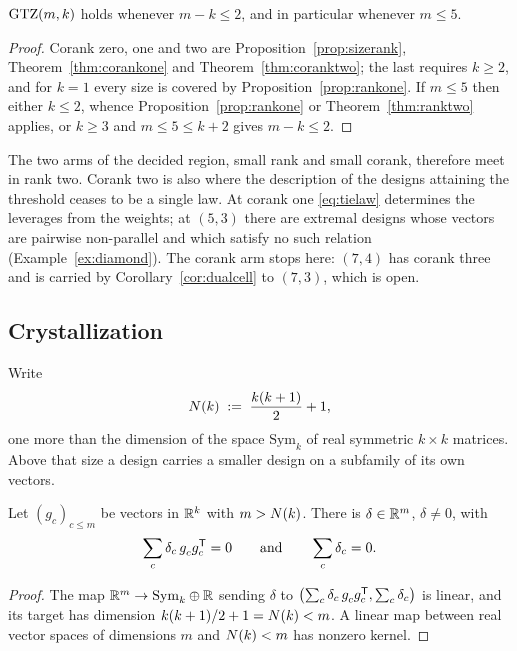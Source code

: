 \begin{corollary}[Lean]\label{cor:corank}
$\mathrm{GTZ}(m,k)$ holds whenever $m-k\le2$, and in particular whenever $m\le5$.
\end{corollary}

\begin{proof}
Corank zero, one and two are Proposition~\ref{prop:sizerank},
Theorem~\ref{thm:corankone} and Theorem~\ref{thm:coranktwo}; the last
requires $k\ge2$, and for $k=1$ every size is covered by
Proposition~\ref{prop:rankone}.  If $m\le5$ then either $k\le2$, whence
Proposition~\ref{prop:rankone} or Theorem~\ref{thm:ranktwo} applies, or
$k\ge3$ and $m\le5\le k+2$ gives $m-k\le2$.
\end{proof}

The two arms of the decided region, small rank and small corank,
therefore meet in rank two.  Corank two is also where the description of
the designs attaining the threshold ceases to be a single law.  At corank
one \eqref{eq:tielaw} determines the leverages from the weights; at
$(5,3)$ there are extremal designs whose vectors are pairwise
non-parallel and which satisfy no such relation
(Example~\ref{ex:diamond}).  The corank arm stops here: $(7,4)$ has corank
three and is carried by Corollary~\ref{cor:dualcell} to $(7,3)$, which is
open.

\subsection{Crystallization}\label{sec:crystal}

Write
\[
  N(k)\;:=\;\frac{k(k+1)}{2}+1 ,
\]
one more than the dimension of the space $\mathrm{Sym}_k$ of real
symmetric $k\times k$ matrices.  Above that size a design carries a
smaller design on a subfamily of its own vectors.

\begin{lemma}[Lean]\label{lem:null}
Let $(g_c)_{c\le m}$ be vectors in $\mathbb{R}^k$ with $m>N(k)$.  There is
$\delta\in\mathbb{R}^m$, $\delta\ne0$, with
\begin{equation}\label{eq:moment}
  \sum_c \delta_c\,g_c^{\vphantom{\mathsf{T}}}g_c\tp=0
  \qquad\text{and}\qquad
  \sum_c \delta_c=0 .
\end{equation}
\end{lemma}

\begin{proof}
The map $\mathbb{R}^m\to\mathrm{Sym}_k\oplus\mathbb{R}$ sending $\delta$ to
$\bigl(\sum_c\delta_c\,g_c^{\vphantom{\mathsf{T}}}g_c\tp,\sum_c\delta_c\bigr)$ is
linear, and its target has dimension $k(k+1)/2+1=N(k)<m$.  A linear map
between real vector spaces of dimensions $m$ and $N(k)<m$ has nonzero
kernel.
\end{proof}

